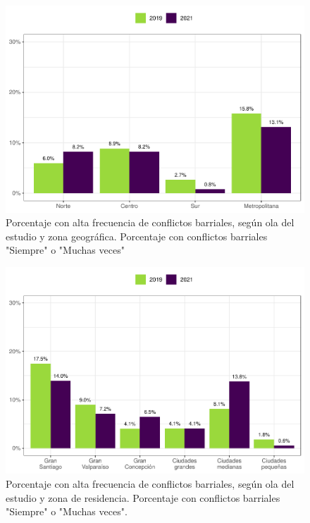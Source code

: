 \documentclass[
  12pt,
]{book}
\begin{document}
\begin{figure}

{\centering \includegraphics{reporte-elsoc_files/figure-latex/confli-zona-1} 

}

\caption{Porcentaje con alta frecuencia de conflictos barriales, según ola del estudio y zona geográfica. Porcentaje con conflictos barriales "Siempre" o "Muchas veces"}\label{fig:confli-zona}
\end{figure}

\begin{figure}

{\centering \includegraphics{reporte-elsoc_files/figure-latex/confli-estrato-1} 

}

\caption{Porcentaje con alta frecuencia de conflictos barriales, según ola del estudio y zona de residencia. Porcentaje con conflictos barriales "Siempre" o "Muchas veces".}\label{fig:confli-estrato}
\end{figure}
\end{document}
